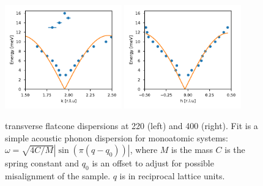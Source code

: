 \begin{figure}
    \centering
    \includegraphics[width=0.45\textwidth]{fig/lowen/dispersion_220T.pdf}
    \includegraphics[width=0.45\textwidth]{fig/lowen/dispersion_400T.pdf}
    \caption[flatcone dispersion 220T/400T]{transverse flatcone dispersions at 220 (left) and 400 (right). Fit is a simple acoustic phonon dispersion for monoatomic systems: $\omega = \sqrt{4C/M} | \sin ( \pi (q-q_0) ) | $, where $M$ is the mass $C$ is the spring constant and $q_0$ is an offset to adjust for possible misalignment of the sample. $q$ is in reciprocal lattice units.}
    \label{fig:transverse_phonons_flatcone}
\end{figure}

